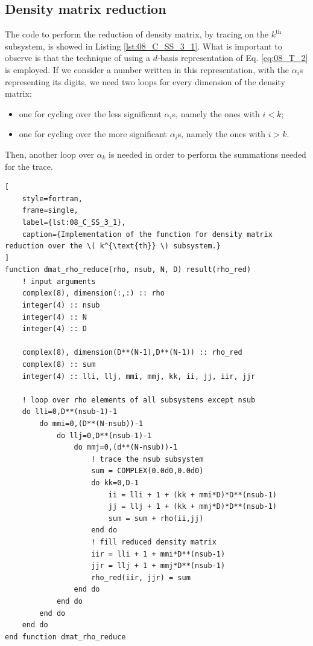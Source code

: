 \documentclass[pra, onecolumn, notitlepage, floats, 11pt]{revtex4-1}
\begin{document}
\subsection{Density matrix reduction}
The code to perform the reduction of density matrix, by tracing on the \( k^{\text{th}} \) subsystem, is showed in Listing \ref{lst:08_C_SS_3_1}. What is important to observe is that the technique of using a \( d \)-basis representation of Eq. \ref{eq:08_T_2} is employed. If we consider a number written in this representation, with the \( \alpha_{i} \)s representing its digits, we need two loops for every dimension of the density matrix:
\begin{itemize}
    \setlength\itemsep{-3pt}
    \item one for cycling over the less significant \( \alpha_{i} \)s, namely the ones with \( i < k \);
    \item one for cycling over the more significant \( \alpha_{i} \)s, namely the ones with \( i > k \).
\end{itemize}
Then, another loop over \( \alpha_{k} \) is needed in order to perform the summations needed for the trace.

\medskip
\begin{lstlisting}[
    style=fortran,
    frame=single,
    label={lst:08_C_SS_3_1},
    caption={Implementation of the function for density matrix reduction over the \( k^{\text{th}} \) subsystem.}
]
function dmat_rho_reduce(rho, nsub, N, D) result(rho_red)
    ! input arguments
    complex(8), dimension(:,:) :: rho
    integer(4) :: nsub
    integer(4) :: N
    integer(4) :: D

    complex(8), dimension(D**(N-1),D**(N-1)) :: rho_red
    complex(8) :: sum
    integer(4) :: lli, llj, mmi, mmj, kk, ii, jj, iir, jjr

    ! loop over rho elements of all subsystems except nsub
    do lli=0,D**(nsub-1)-1
        do mmi=0,(D**(N-nsub))-1
            do llj=0,D**(nsub-1)-1
                do mmj=0,(d**(N-nsub))-1
                    ! trace the nsub subsystem
                    sum = COMPLEX(0.0d0,0.0d0)
                    do kk=0,D-1
                        ii = lli + 1 + (kk + mmi*D)*D**(nsub-1)
                        jj = llj + 1 + (kk + mmj*D)*D**(nsub-1)
                        sum = sum + rho(ii,jj)
                    end do
                    ! fill reduced density matrix
                    iir = lli + 1 + mmi*D**(nsub-1)
                    jjr = llj + 1 + mmj*D**(nsub-1)
                    rho_red(iir, jjr) = sum
                end do
            end do
        end do
    end do
end function dmat_rho_reduce
\end{lstlisting}
\end{document}
